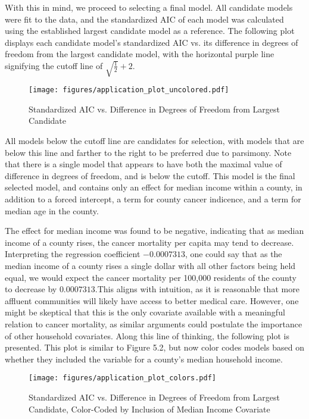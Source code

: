 		With this in mind, we proceed to selecting a final model. All candidate models were fit to the data, and the standardized AIC of each model was calculated
		using the established largest candidate model as a reference. The following plot displays each candidate model's standardized AIC vs. its difference in
		degrees of freedom from the largest candidate model, with the horizontal purple line signifying the cutoff line of $\sqrt{\frac{1}{2}} + 2$.

		\begin{figure}[H]
			\centering
			\captionsetup{justification=centering}
			\texttt{[image: figures/application\_plot\_uncolored.pdf]}
			\caption{\label{fig:app_stand_AIC_plot_no_colors} Standardized AIC vs. Difference in Degrees of Freedom from Largest Candidate}
		\end{figure}

		All models below the cutoff line are candidates for selection, with models that are below this line and farther to the right to be preferred due to parsimony. Note
		that there is a single model that appears to have both the maximal value of difference in degrees of freedom, and is below the cutoff. This model is the
		final selected model, and contains only an effect for median income within a county, in addition to a forced intercept, a term for county cancer indicence,
		and a term for median age in the county.
		
		The effect for median income was found to be negative, indicating that as median income of a county rises, the cancer mortality per capita may tend to
		decrease.  Interpreting the regression coefficient $-0.0007313$, one could say that as the median income of a county rises a single dollar with all other factors being
		held equal, we would expect the cancer mortality per 100,000 residents of the county to decrease by $0.0007313$.This aligns with intuition, as it is reasonable
		that more affluent communities will likely have access to better medical care. However, one might be skeptical that this is the only covariate available with a meaningful
		relation to cancer mortality, as similar arguments could postulate the importance of other household covariates. Along this line of thinking, the following plot
		is presented. This plot is similar to Figure 5.2, but now color codes models based on whether they included the variable for a county's median household income.

		\begin{figure}[H]
			\centering
			\captionsetup{justification=centering}
			\texttt{[image: figures/application\_plot\_colors.pdf]}
			\caption{\label{fig:app_stand_AIC_plot_colors} Standardized AIC vs. Difference in Degrees of Freedom from Largest Candidate,
			Color-Coded by Inclusion of Median Income Covariate}
		\end{figure}

